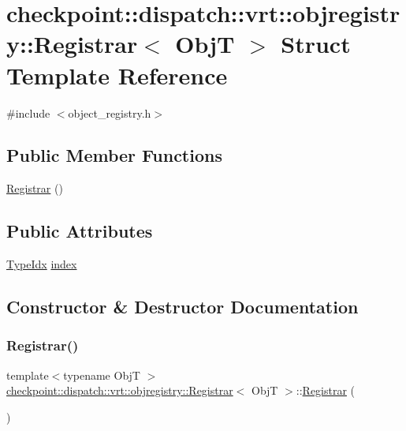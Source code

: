 \hypertarget{structcheckpoint_1_1dispatch_1_1vrt_1_1objregistry_1_1_registrar}{}\section{checkpoint\+:\+:dispatch\+:\+:vrt\+:\+:objregistry\+:\+:Registrar$<$ ObjT $>$ Struct Template Reference}
\label{structcheckpoint_1_1dispatch_1_1vrt_1_1objregistry_1_1_registrar}


{\ttfamily \#include $<$object\+\_\+registry.\+h$>$}

\subsection*{Public Member Functions}
\begin{DoxyCompactItemize}
\item 
\hyperlink{structcheckpoint_1_1dispatch_1_1vrt_1_1objregistry_1_1_registrar_a657fb517d93e28627c16a38ee44cd298}{Registrar} ()
\end{DoxyCompactItemize}
\subsection*{Public Attributes}
\begin{DoxyCompactItemize}
\item 
\hyperlink{namespacecheckpoint_1_1dispatch_1_1vrt_acd3f9e6b091bcfbc23dc35ea8ef45d3b}{Type\+Idx} \hyperlink{structcheckpoint_1_1dispatch_1_1vrt_1_1objregistry_1_1_registrar_a21eae921e8f1dbfe2ecf085912db5507}{index}
\end{DoxyCompactItemize}


\subsection{Constructor \& Destructor Documentation}
\mbox{\label{structcheckpoint_1_1dispatch_1_1vrt_1_1objregistry_1_1_registrar_a657fb517d93e28627c16a38ee44cd298}} 
\subsubsection{\texorpdfstring{Registrar()}{Registrar()}}
{\footnotesize\ttfamily template$<$typename ObjT $>$ \\
\hyperlink{structcheckpoint_1_1dispatch_1_1vrt_1_1objregistry_1_1_registrar}{checkpoint\+::dispatch\+::vrt\+::objregistry\+::\+Registrar}$<$ ObjT $>$\+::\hyperlink{structcheckpoint_1_1dispatch_1_1vrt_1_1objregistry_1_1_registrar}{Registrar} (\begin{DoxyParamCaption}{ }\end{DoxyParamCaption})}



